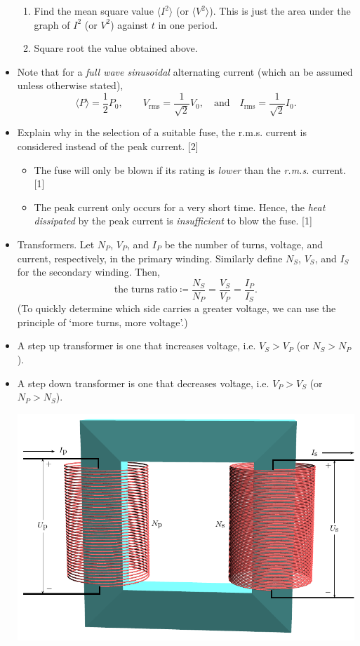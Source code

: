 \documentclass[oneside]{book}
\begin{document}
\begin{itemize}
\begin{enumerate}
        \item Find the mean square value \(\langle I^2 \rangle\) (or \(\langle V^2 \rangle\)). This is just the area under the graph of \(I^2\) (or \(V^2\)) against \(t\) in one period.
        \item Square root the value obtained above.
    \end{enumerate}
    \item Note that for a \emph{full wave sinusoidal} alternating current (which an be assumed unless otherwise stated), 
    \[\langle P \rangle=\frac{1}{2}P_0,\qquad V_{\text{rms}}=\frac{1}{\sqrt{2}}V_0,\quad\text{and}\quad I_{\text{rms}}=\frac{1}{\sqrt{2}}I_0.\]
    \item Explain why in the selection of a suitable fuse, the r.m.s. current is considered instead of the peak current. \hspace*{\fill} [2]
    \begin{itemize}
        \item The fuse will only be blown if its rating is \emph{lower} than the \emph{r.m.s.} current. \hspace*{\fill} [1]
        \item The peak current only occurs for a very short time. Hence, the \emph{heat dissipated} by the peak current is \emph{insufficient} to blow the fuse. \hspace*{\fill} [1]
    \end{itemize}
    \item Transformers. Let \(N_P\), \(V_P\), and \(I_P\) be the number of turns, voltage, and current, respectively, in the primary winding. Similarly define \(N_S\), \(V_S\), and \(I_S\) for the secondary winding. Then,
    \[\text{the turns ratio}\coloneq\frac{N_S}{N_P}=\frac{V_S}{V_P}=\frac{I_P}{I_S}.\]
    (To quickly determine which side carries a greater voltage, we can use the principle of `more turns, more voltage'.)
    \item A step up transformer is one that increases voltage, i.e. \(V_S>V_P\) (or \(N_S>N_P\)).
    \item A step down transformer is one that decreases voltage, i.e. \(V_P>V_S\) (or \(N_P>N_S\)).
    \begin{center}
        \includegraphics[width=\textwidth-30pt]{../images/Transformer/TransformerCropped.pdf}

\end{center}
\end{itemize}
\end{document}
